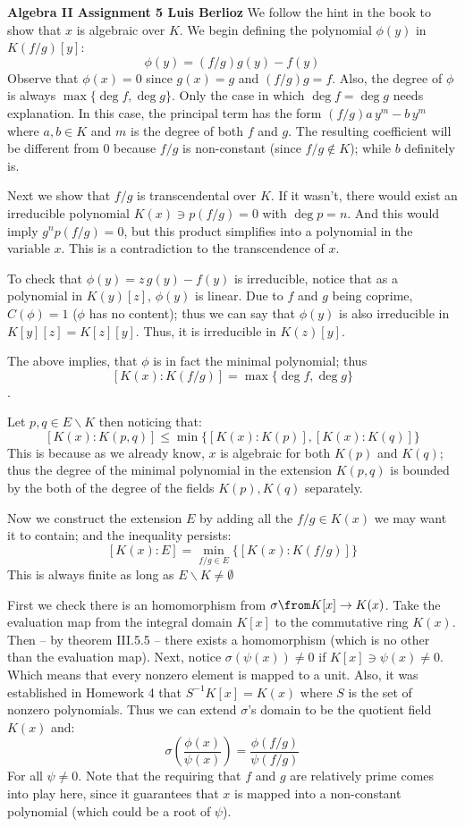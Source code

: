 \noindent\textbf{Algebra II Assignment 5 \hspace{\fill} Luis Berlioz}
We follow the hint in the book to show that $x$ is algebraic over $K$. 
We begin defining the polynomial $\phi(y)$ in $K(f/g)[y]$:
$$\phi(y) = (f/g)g(y) - f(y)$$
Observe that $\phi(x) =0$ since $g(x)=g$ and $(f/g)g=f$. 
Also, the degree of $\phi$ is always $\max\{ \deg f, \deg g\}$. 
Only the case in which $\deg f= \deg g$ needs explanation. 
In this case, the principal term has the form $(f/g) a\, y^m - b\, y^m$ where $a,b\in K$ and $m$ is the degree of both $f$ and $g$.
The resulting coefficient will be different from 0 because $f/g$ is non-constant (since $f/g\notin K$); while $b$ definitely is.

Next we show that $f/g$ is transcendental over $K$.
If it wasn't, there would exist an irreducible polynomial $K(x) \ni p(f/g)=0$ with $\deg p = n$.
And this would imply $g^np(f/g)=0$, but this product simplifies into a polynomial in the variable $x$.
This is a contradiction to the transcendence of $x$.

To check that $\phi(y)=z\,g(y)-f(y)$ is irreducible, notice that as a polynomial in $K(y)[z]$, $\phi(y)$ is linear. 
Due to $f$ and $g$ being coprime, $C(\phi)=1$ ($\phi$ has no content); thus we can say that  $\phi(y)$ is also irreducible in $K[y][z]=K[z][y]$.
Thus, it is irreducible in $K(z)[y]$.

The above implies, that $\phi$ is in fact the minimal polynomial; thus $$[K(x):K(f/g)]= \max\{ \deg f, \deg g\}$$.

Let $p,q\in E\backslash K$ then noticing that:
$$[K(x):K(p,q)] \leq \min\{ [K(x):K(p)], [K(x):K(q)]\}$$
This is because as we already know,  $x$ is algebraic for both $K(p)$ and $K(q)$; 
thus the degree of the minimal polynomial in the extension $K(p,q)$ is bounded by the both of the degree of the fields $K(p),K(q)$ separately.  

Now we construct the extension $E$ by adding all the $f/g\in K(x)$ we may want it to contain; and the inequality persists:
$$[K(x):E] = \min_{f/g\in E} \{[K(x):K(f/g)]\}$$
This is always finite as long as $E\backslash K\neq \emptyset$

First we check there is an homomorphism from $\sigma \from K[x]\to K(x)$.
Take the evaluation map from the integral domain $K[x]$ to the commutative ring $K(x)$.
Then -- by theorem III.5.5 -- there exists a homomorphism (which is no other than the evaluation map).
Next, notice $\sigma(\psi(x))\neq 0$ if $K[x]\ni \psi(x) \neq 0$. Which means that every nonzero element is mapped to a unit.
Also, it was established in Homework 4 that $S^{-1}K[x] = K(x)$ where $S$ is the set of nonzero polynomials.
Thus we can extend $\sigma$'s domain to be the quotient field $K(x)$ and:
\begin{equation} \label{ecua.1}
\sigma\left(\frac{\phi(x)}{\psi(x)}\right) = \frac{\phi(f/g)}{\psi(f/g)}
\end{equation}
For all $\psi\neq 0$. 
Note that the requiring that $f$ and $g$ are relatively prime comes into play here, since it guarantees that $x$ is mapped into a non-constant polynomial (which could be a root of $\psi$).

